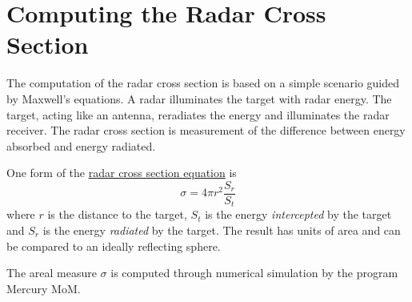 % 

\section{Computing the Radar Cross Section}
The computation of the radar cross section is based on a simple scenario guided by Maxwell's equations. A radar illuminates the target with radar energy. The target, acting like an antenna, reradiates the energy and illuminates the radar receiver. The radar cross section is measurement of the difference between energy absorbed and energy radiated.

One form of the \href{https://www.radartutorial.eu/01.basics/Radar\%20Cross\%20Section.en.html}{radar cross section equation} is
\begin{equation}
	\sigma=4\pi r^{2} \frac{S_{r}}{S_{t}}
\end{equation}
where $r$ is the distance to the target, $S_{t}$ is the energy {\it{intercepted}} by the target and $S_{r}$ is the energy {\it{radiated}} by the target. The result has units of area and can be compared to an ideally reflecting sphere.

The areal measure $\sigma$ is computed through numerical simulation by the program Mercury MoM.

